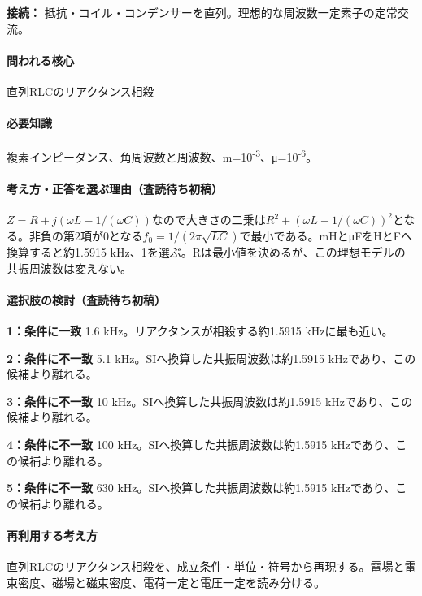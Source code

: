 \noindent\textbf{接続：} 抵抗・コイル・コンデンサーを直列。理想的な周波数一定素子の定常交流。\par

\paragraph{問われる核心} 直列RLCのリアクタンス相殺

\paragraph{必要知識} 複素インピーダンス、角周波数と周波数、m=\allowbreak{}10\textsuperscript{-3}、μ=10\textsuperscript{-6}。

\paragraph{考え方・正答を選ぶ理由（査読待ち初稿）} \(Z=R+j(\omega L-1/(\omega C))\)なので大きさの二乗は\(R^2+(\omega L-1/(\omega C))^2\)となる。非負の第2項が0となる\(f_0=1/(2\pi\sqrt{LC})\)で最小である。mHとμFをHとFへ換算すると約1.5915 kHz、1を選ぶ。Rは最小値を決めるが、この理想モデルの共振周波数は変えない。

\paragraph{選択肢の検討（査読待ち初稿）}\mbox{}\par

\noindent\textbf{1：条件に一致} 1.6 kHz。リアクタンスが相殺する約1.5915 kHzに最も近い。\par

\noindent\textbf{2：条件に不一致} 5.1 kHz。SIへ換算した共振周波数は約1.5915 kHzであり、この候補より離れる。\par

\noindent\textbf{3：条件に不一致} 10 kHz。SIへ換算した共振周波数は約1.5915 kHzであり、この候補より離れる。\par

\noindent\textbf{4：条件に不一致} 100 kHz。SIへ換算した共振周波数は約1.5915 kHzであり、この候補より離れる。\par

\noindent\textbf{5：条件に不一致} 630 kHz。SIへ換算した共振周波数は約1.5915 kHzであり、この候補より離れる。\par

\paragraph{再利用する考え方} 直列RLCのリアクタンス相殺を、成立条件・単位・符号から再現する。電場と電束密度、磁場と磁束密度、電荷一定と電圧一定を読み分ける。

